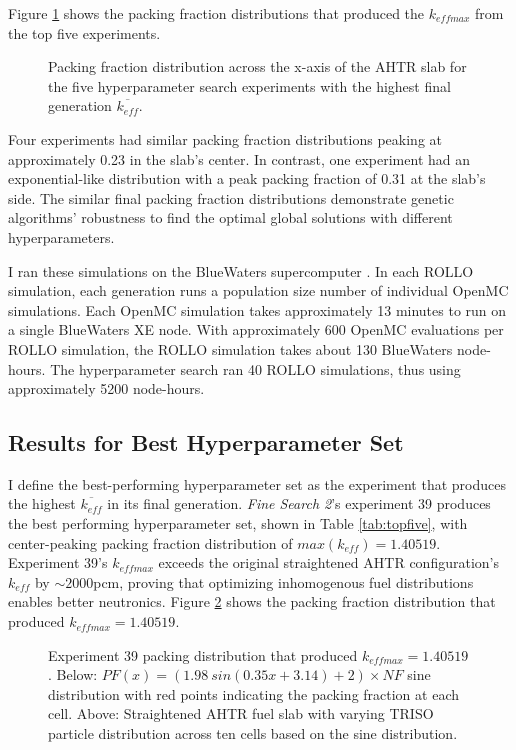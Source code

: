 Figure \ref{fig:topfiveplot} shows the packing fraction distributions that 
produced the $k_{eff max}$ from the top five experiments. 
\begin{figure}[]
    \centering
    \caption{Packing fraction distribution across the x-axis of the \acrfull{AHTR} 
    slab for the five hyperparameter search experiments with the highest final generation 
    $\overline{k_{eff}}$.}
    \label{fig:topfiveplot}
\end{figure}
Four experiments had similar packing fraction distributions peaking at approximately 
0.23 in the slab's center. 
In contrast, one experiment had an exponential-like distribution with a peak 
packing fraction of 0.31 at the slab's side.
The similar final packing fraction distributions demonstrate genetic algorithms' 
robustness to find the optimal global solutions with different hyperparameters. 

I ran these simulations on the BlueWaters supercomputer \cite{ncsa_about_2017}. 
In each \gls{ROLLO} simulation, each generation runs a population size number 
of individual OpenMC simulations. 
Each OpenMC simulation takes approximately 13 minutes to run on a single BlueWaters 
XE node. 
With approximately 600 OpenMC evaluations per \gls{ROLLO} simulation, the
\gls{ROLLO} simulation takes about 130 BlueWaters node-hours. 
The hyperparameter search ran 40 \gls{ROLLO} simulations, thus using approximately
5200 node-hours.

\subsection{Results for Best Hyperparameter Set}
\label{sec:best}
I define the best-performing hyperparameter set as the experiment that produces 
the highest $\overline{k_{eff}}$ in its final generation. 
\textit{Fine Search 2}'s experiment 39 produces the best performing 
hyperparameter set, shown in Table \ref{tab:topfive}, with 
center-peaking packing fraction distribution of $max(k_{eff}) = 1.40519$. 
Experiment 39's $k_{eff max}$ exceeds the original straightened \gls{AHTR} 
configuration's $k_{eff}$ by $\sim2000$pcm, proving that optimizing
inhomogenous fuel distributions enables better neutronics. 
Figure \ref{fig:triso_distribution_sine_39} shows the packing fraction distribution 
that produced $k_{eff max} = 1.40519$. 
\begin{figure}[]
    \centering
    \caption{Experiment 39 packing distribution that produced $k_{eff max} = 1.40519$. 
    Below: $PF(x) = (1.98\ sin(0.35x+3.14)+2)  \times NF$ sine distribution with 
    red points indicating the packing fraction at each cell. 
    Above: Straightened \acrfull{AHTR} fuel slab with varying \gls{TRISO} particle 
    distribution across ten cells based on the sine distribution. }
    \label{fig:triso_distribution_sine_39}
\end{figure}

